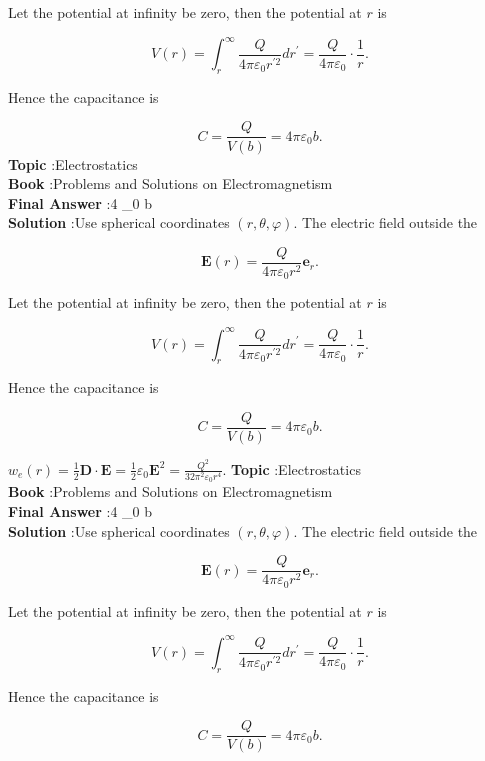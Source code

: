 \documentclass[10pt]{article}
\begin{document}
Let the potential at infinity be zero, then the potential at $r$ is

$$
V(r)=\int_{r}^{\infty} \frac{Q}{4 \pi \varepsilon_{0} r^{\prime 2}} d r^{\prime}=\frac{Q}{4 \pi \varepsilon_{0}} \cdot \frac{1}{r} .
$$



Hence the capacitance is

$$
C=\frac{Q}{V(b)}=4 \pi \varepsilon_{0} b .
$$
\textbf{Topic} :Electrostatics\\
\textbf{Book} :Problems and Solutions on Electromagnetism\\
\textbf{Final Answer} :4 \pi \varepsilon_{0} b\\


\textbf{Solution} :Use spherical coordinates $(r, \theta, \varphi)$. The electric field outside the

$$
\mathbf{E}(r)=\frac{Q}{4 \pi \varepsilon_{0} r^{2}} \mathbf{e}_{r} .
$$

Let the potential at infinity be zero, then the potential at $r$ is

$$
V(r)=\int_{r}^{\infty} \frac{Q}{4 \pi \varepsilon_{0} r^{\prime 2}} d r^{\prime}=\frac{Q}{4 \pi \varepsilon_{0}} \cdot \frac{1}{r} .
$$



Hence the capacitance is

$$
C=\frac{Q}{V(b)}=4 \pi \varepsilon_{0} b .
$$

 $w_{e}(r)=\frac{1}{2} \mathbf{D} \cdot \mathbf{E}=\frac{1}{2} \varepsilon_{0} \mathbf{E}^{2}=\frac{Q^{2}}{32 \pi^{2} \varepsilon_{0} r^{4}}$.
\textbf{Topic} :Electrostatics\\
\textbf{Book} :Problems and Solutions on Electromagnetism\\
\textbf{Final Answer} :4 \pi \varepsilon_{0} b\\


\textbf{Solution} :Use spherical coordinates $(r, \theta, \varphi)$. The electric field outside the

$$
\mathbf{E}(r)=\frac{Q}{4 \pi \varepsilon_{0} r^{2}} \mathbf{e}_{r} .
$$

Let the potential at infinity be zero, then the potential at $r$ is

$$
V(r)=\int_{r}^{\infty} \frac{Q}{4 \pi \varepsilon_{0} r^{\prime 2}} d r^{\prime}=\frac{Q}{4 \pi \varepsilon_{0}} \cdot \frac{1}{r} .
$$



Hence the capacitance is

$$
C=\frac{Q}{V(b)}=4 \pi \varepsilon_{0} b .
$$
\end{document}

